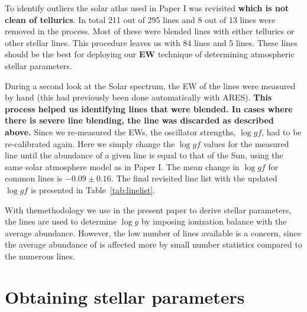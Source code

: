 \documentclass{aa}
\begin{document}
To identify outliers the solar atlas used in Paper I was revisited {\bf which is not clean of
tellurics}. In total 211 out of 295  lines and 8 out of 13  lines were
removed in the process. Most of these were blended lines with either tellurics or other stellar
lines. This procedure leaves us with 84  lines and 5  lines. These lines
should be the best for deploying our {\bf EW} technique of determining atmospheric stellar
parameters.

During a second look at the Solar spectrum, the EW of the lines were measured by hand (this had
previously been done automatically with ARES). {\bf This process helped us identifying lines that
were blended. In cases where there is severe line blending, the line was discarded as described
above.} Since we re-measured the EWs, the oscillator strengths, $\log \mathit{gf}$, had to be
re-calibrated again. Here we simply change the $\log \mathit{gf}$ values for the measured line until
the abundance of a given line is equal to that of the Sun, using the same solar atmosphere model as
in Paper I. The mean change in $\log \mathit{gf}$ for common lines is $-0.09 \pm 0.16$. The final
revisited line list with the updated $\log \mathit{gf}$ is presented in Table~\ref{tab:linelist}.

With themethodology we use in the present paper to derive stellar parameters, the  lines
are used to determine $\log g$ by imposing ionization balance with the average 
abundance. However, the low number of  lines available is a concern, since the average
abundance of  is affected more by small number statistics compared to the numerous
 lines.


\section{Obtaining stellar parameters}
\label{sec:method}
\end{document}
